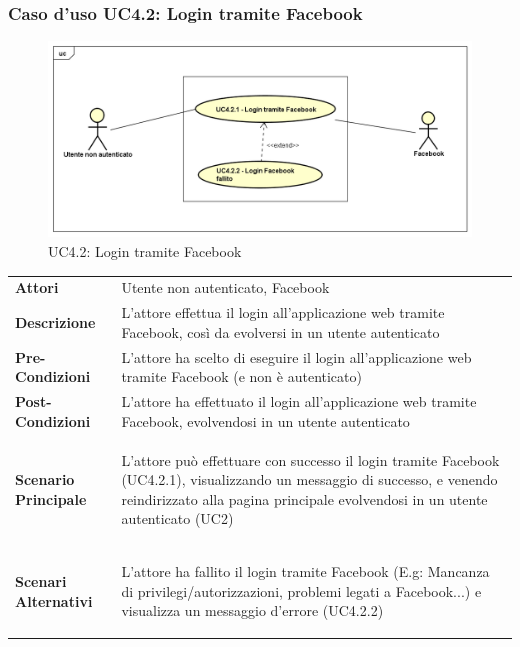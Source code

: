 \newpage
\subsubsection{Caso d'uso UC4.2: Login tramite Facebook }
\label{UC4_2}
\begin{figure}[!htbp]
	\centering
	\includegraphics[scale=0.45]{UML/UC4_2.png}
	\caption{UC4.2: Login tramite Facebook}
\end{figure}

\begin{tabular}{ l | p{11cm}}
	\hline
	\rowcolor{Gray}
	 \multicolumn{2}{c}{UC4.2 - Login tramite Facebook} \\
	 \hline
	\textbf{Attori} & Utente non autenticato, Facebook \\
	\textbf{Descrizione} & L'attore effettua il login all'applicazione web tramite Facebook, così da evolversi in un utente autenticato \\
	\textbf{Pre-Condizioni} & L'attore ha scelto di eseguire il login all'applicazione web tramite Facebook (e non è autenticato) \\
	\textbf{Post-Condizioni} & L'attore ha effettuato il login all'applicazione web tramite Facebook, evolvendosi in un utente autenticato \\
	\textbf{Scenario Principale} & \begin{enumerate*}[label=(\arabic*.),itemjoin={\newline}]
		\item L'attore può effettuare con successo il login tramite Facebook (UC4.2.1), visualizzando un messaggio di successo, e venendo reindirizzato alla pagina principale evolvendosi in un utente autenticato (UC2)
	\end{enumerate*}\\
	\textbf{Scenari Alternativi} & \begin{enumerate*}[label=(\arabic*.),itemjoin={\newline}]
	\item L'attore ha fallito il login tramite Facebook (E.g: Mancanza di privilegi/autorizzazioni, problemi legati a Facebook...) e visualizza un messaggio d'errore (UC4.2.2)
	\end{enumerate*}\\
\end{tabular}